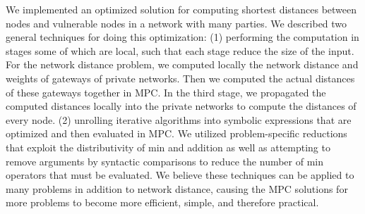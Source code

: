 We implemented an optimized solution for computing shortest distances between nodes and vulnerable nodes in a network with many parties. We described two general techniques for doing this optimization: (1) performing the computation in stages some of which are local, such that each stage reduce the size of the input. For the network distance problem, we computed locally the network distance and weights of gateways of private networks. Then we computed the actual distances of these gateways together in MPC. In the third stage, we propagated the computed distances locally into the private networks to compute the distances of every node. (2) unrolling iterative algorithms into symbolic expressions that are optimized and then evaluated in MPC. We utilized problem-specific reductions that exploit the distributivity of min and addition as well as attempting to remove arguments by syntactic comparisons to reduce the number of min operators that must be evaluated. We believe these techniques can be applied to many problems in addition to network distance, causing the MPC solutions for more problems to become more efficient, simple, and therefore practical.
